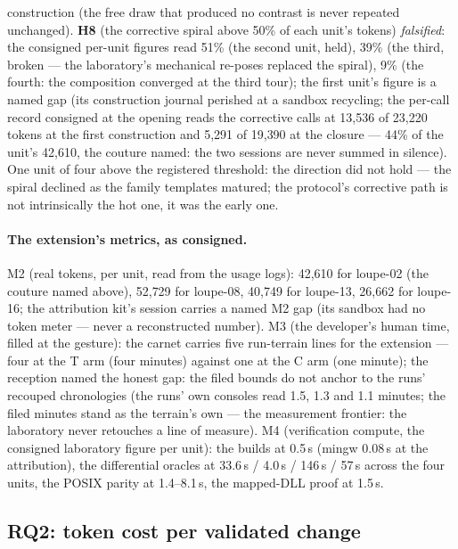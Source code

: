 \documentclass[11pt,a4paper]{article}
\begin{document}
construction (the free draw that produced no contrast is never
repeated unchanged). \textbf{H8} (the
corrective spiral above 50\% of each unit's tokens) \emph{falsified}:
the consigned per-unit figures read 51\% (the second unit, held),
39\% (the third, broken --- the laboratory's mechanical re-poses
replaced the spiral), 9\% (the fourth: the composition converged at
the third tour); the first unit's figure is a named gap (its
construction journal perished at a sandbox recycling; the per-call
record consigned at the opening reads the corrective calls at
13{,}536 of 23{,}220 tokens at the first construction and 5{,}291 of
19{,}390 at the closure --- 44\% of the unit's 42{,}610, the couture
named: the two sessions are never summed in silence). One unit of
four above the registered threshold: the direction did not hold ---
the spiral declined as the family templates matured; the protocol's
corrective path is not intrinsically the hot one, it was the early
one.

\paragraph{The extension's metrics, as consigned.} M2 (real tokens,
per unit, read from the usage logs): 42{,}610 for loupe-02 (the
couture named above), 52{,}729 for loupe-08, 40{,}749 for loupe-13,
26{,}662 for loupe-16; the attribution kit's session carries a named
M2 gap (its sandbox had no token meter --- never a reconstructed
number). M3 (the developer's human time, filled at the gesture): the
carnet carries five run-terrain lines for the extension --- four at
the T arm (four minutes) against one at the C arm (one minute); the
reception named the honest gap: the filed bounds do not anchor to the
runs' recouped chronologies (the runs' own consoles read 1.5, 1.3 and
1.1 minutes; the filed minutes stand as the terrain's own --- the
measurement frontier: the laboratory never retouches a line of
measure). M4 (verification compute, the consigned laboratory figure
per unit): the builds at 0.5\,s (mingw 0.08\,s at the attribution),
the differential oracles at 33.6\,s / 4.0\,s / 146\,s / 57\,s
across the four units, the POSIX parity at 1.4--8.1\,s, the
mapped-DLL proof at 1.5\,s.



\subsection{RQ2: token cost per validated change}\label{sec:rq2}
\end{document}
